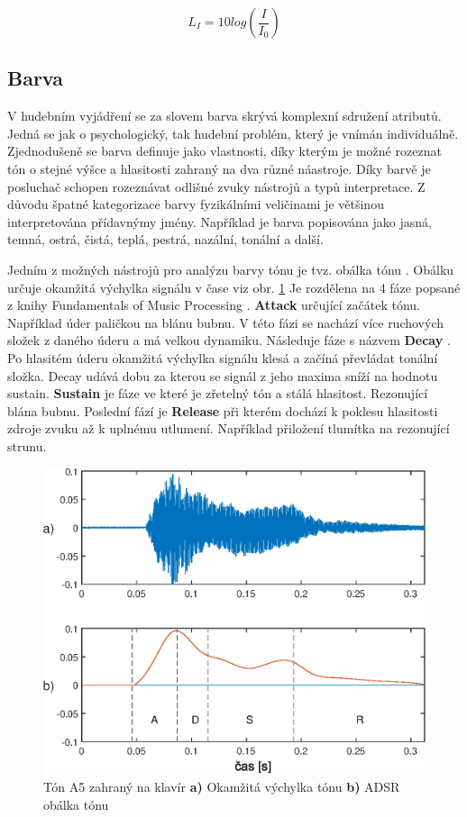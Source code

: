   \begin{equation}
    L_I = 10log(\frac{I}{I_0})
    \label{rov:hladina_intenzity}
  \end{equation}

  \subsection{Barva} \label{sec:Barva}

  V hudebním vyjádření se za slovem barva skrývá komplexní sdružení atributů.
  Jedná se jak o psychologický, tak hudební problém, který je vnímán individuálně\cite{The_perception_of_musical_timbre}. Zjednodušeně se barva definuje jako vlastnosti, díky kterým je možné rozeznat tón o stejné výšce a hlasitosti zahraný na dva různé náastroje\cite{MULLER2014713}.
  Díky barvě je posluchač schopen rozeznávat odlišné zvuky nástrojů a typů interpretace. Z důvodu špatné kategorizace barvy fyzikálními veličinami je většinou interpretována přídavnýmy jmény.
  Například je barva popisována jako jasná, temná, ostrá, čistá, teplá, pestrá, nazální, tonální a další.

  Jedním z možných nástrojů pro analýzu barvy tónu je tvz. obálka tónu .
  Obálku určuje okamžitá výchylka signálu v čase viz obr. \ref{fig:ADSR_envelope_on_piano_tone}
  Je rozdělena na 4 fáze popsané z knihy Fundamentals of Music Processing \cite{fundamental_of_music_processing}.
  \textbf{Attack } určující začátek tónu. Například úder paličkou na blánu bubnu.
  V této fázi se nachází více ruchových složek z daného úderu a má velkou dynamiku.
  Následuje fáze s názvem \textbf{Decay }.
  Po hlasitém úderu okamžitá výchylka signálu klesá a začíná převládat tonální složka. Decay udává dobu za kterou se signál z jeho maxima sníží na hodnotu sustain.
  \textbf{Sustain } je fáze ve které je zřetelný tón a stálá hlasitost. Rezonující blána bubnu.
  Poslední fází je \textbf{Release } při kterém dochází k poklesu hlasitosti zdroje zvuku až k uplnému utlumení.
  Například přiložení tlumítka na rezonující strunu.

  \begin{figure}[H]
    \centering
    \includegraphics[width = 0.8\linewidth]{obrazky/ADSR.eps}
    \caption{Tón A5 zahraný na klavír \textbf{a)} Okamžitá výchylka tónu \textbf{b)} ADSR obálka tónu}
    \label{fig:ADSR_envelope_on_piano_tone}
  \end{figure}

